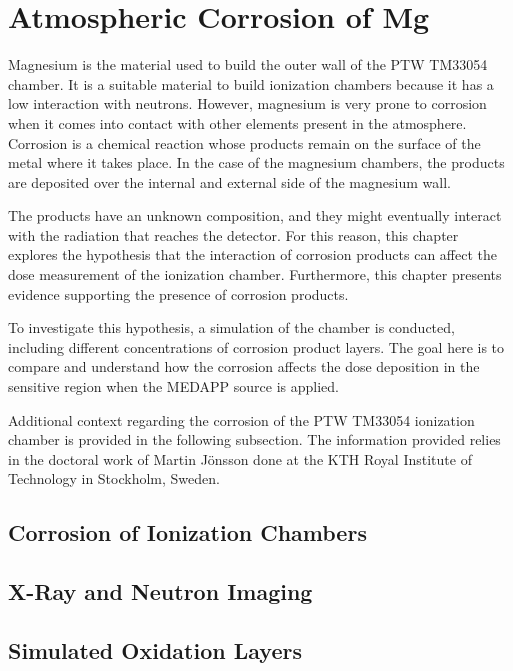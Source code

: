 \chapter{Atmospheric Corrosion of Mg}
Magnesium is the material used to build the outer wall of the PTW TM33054 chamber. It is a suitable material to build ionization chambers because it has a low interaction with neutrons. However, magnesium is very prone to corrosion when it comes into contact with other elements present in the atmosphere. Corrosion is a chemical reaction whose products remain on the surface of the metal where it takes place. In the case of the magnesium chambers, the products are deposited over the internal and external side of the magnesium wall. 

The products have an unknown composition, and they might eventually interact with the radiation that reaches the detector. For this reason, this chapter explores the hypothesis that the interaction of corrosion products can affect the dose measurement of the ionization chamber. Furthermore, this chapter presents evidence supporting the presence of corrosion products.

To investigate this hypothesis, a simulation of the chamber is conducted, including different concentrations of corrosion product layers. The goal here is to compare and understand how the corrosion affects the dose deposition in the sensitive region when the MEDAPP source is applied. 

Additional context regarding the corrosion of the PTW TM33054 ionization chamber is provided in the following subsection. The information provided relies in the doctoral work of Martin Jönsson done at the KTH Royal Institute of Technology in Stockholm, Sweden.

\section{Corrosion of Ionization Chambers}

\section{X-Ray and Neutron Imaging}

\section{Simulated Oxidation Layers}
